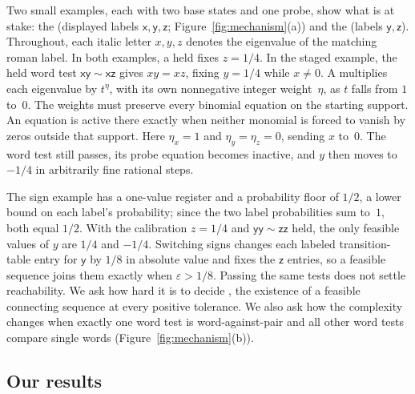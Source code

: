 Two small examples, each with two base states and one probe, show what is at
stake: the  (displayed labels $\mathsf x,\mathsf y,\mathsf z$;
Figure~\ref{fig:mechanism}(a)) and the  (labels
$\mathsf y,\mathsf z$). Throughout, each italic letter $x,y,z$ denotes the
eigenvalue of the matching roman label. In both examples, a held
 fixes $z=1/4$. In the staged example, the held word
test $\mathsf{xy}\sim\mathsf{xz}$ gives $xy=xz$, fixing $y=1/4$ while
$x\neq0$. A  multiplies each eigenvalue by $t^{\eta}$,
with its own nonnegative integer weight~$\eta$, as $t$ falls from $1$ to~$0$.
The weights must preserve every binomial equation  on the
starting support. An equation is active there exactly when neither monomial
is forced to vanish by zeros outside that support. Here
$\eta_x=1$ and $\eta_y=\eta_z=0$, sending $x$ to~$0$. The word test still
passes, its probe equation becomes inactive, and $y$ then moves to $-1/4$ in
arbitrarily fine rational steps.

The sign example has a one-value register and a probability floor of $1/2$, a
lower bound on each label's probability;
since the two label probabilities sum to~$1$, both equal $1/2$. With the
calibration $z=1/4$ and $\mathsf{yy}\sim\mathsf{zz}$ held, the only feasible
values of $y$ are $1/4$ and $-1/4$. Switching signs changes each labeled
transition-table entry for $\mathsf y$ by $1/8$ in absolute value and fixes
the $\mathsf z$ entries, so a feasible sequence joins them exactly when
$\varepsilon>1/8$. Passing the same tests does not settle reachability. We
ask how hard it is to decide , the existence of a
feasible connecting sequence at every positive tolerance. We also ask how the
complexity changes when exactly one word test is word-against-pair and all
other word tests compare single words (Figure~\ref{fig:mechanism}(b)).


\subsection{Our results}\label{sec:results-intro}

